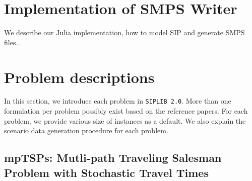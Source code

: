 \section{Implementation of SMPS Writer}

We describe our Julia implementation, how to model SIP and generate SMPS files..


\section{Problem descriptions}

In this section, we introduce each problem in \texttt{SIPLIB 2.0}. More than one formulation per problem possibly exist based on the reference papers. For each problem, we provide various size of instances as a default. We also explain the scenario data generation procedure for each problem. %
\subsection{mpTSPs: Mutli-path Traveling Salesman Problem with Stochastic Travel Times}
